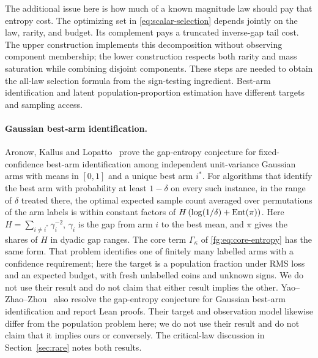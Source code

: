 The additional issue here is how much of a known magnitude law should
pay that entropy cost. The optimizing set in
\eqref{eq:scalar-selection} depends jointly on the law, rarity, and
budget. Its complement pays a truncated inverse-gap tail cost. The
upper construction implements this decomposition without observing
component membership; the lower construction respects both rarity
and mass saturation while combining disjoint components. These steps
are needed to obtain the all-law selection formula from the sign-testing
ingredient. Best-arm identification and latent population-proportion
estimation have different targets and sampling access.

\paragraph{Gaussian best-arm identification.}
Aronow, Kallus and Lopatto~\cite{akl} prove the gap-entropy
conjecture for fixed-confidence best-arm identification among
independent unit-variance Gaussian arms with means in $[0,1]$ and a
unique best arm $i^*$. For algorithms that identify the best arm with
probability at least $1-\delta$ on every such instance, in the range
of $\delta$ treated there, the optimal expected sample count averaged
over permutations of the arm labels is within constant factors of
$H\,(\log(1/\delta)+\operatorname{Ent}(\pi))$. Here $H=\sum_{i\ne i^*}\gamma_i^{-2}$,
$\gamma_i$ is the gap from arm $i$ to the best mean, and $\pi$ gives
the shares of $H$ in dyadic gap ranges. The core term
$\Gamma_\kappa$ of \eqref{fg:eq:core-entropy} has the same form. That problem identifies one of
finitely many labelled arms with a confidence requirement; here the
target is a population fraction under RMS loss and an expected
budget, with fresh unlabelled coins and unknown signs. We do not use
their result and do not claim that either result implies the other.
Yao--Zhao--Zhou~\cite{yao} also resolve the gap-entropy conjecture
for Gaussian best-arm identification and report Lean proofs. Their
target and observation model likewise differ from the population
problem here; we do not use their result and do not claim that it
implies ours or conversely. The critical-law discussion in
Section~\ref{sec:rare} notes both results.

